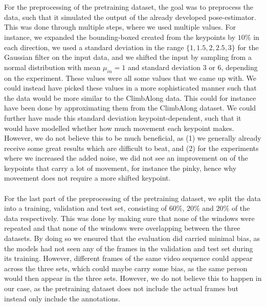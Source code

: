 \documentclass[./main.tex]{subfiles}
\begin{document}
\\
\\
For the preprocessing of the pretraining dataset, the goal was to preprocess the data, such that it simulated the output of the already developed pose-estimator. This was done through multiple steps, where we used multiple values. For instance, we expanded the bounding-boxed created from the keypoints by $10\%$ in each direction, we used a standard deviation in the range $\{1, 1.5, 2, 2.5, 3\}$ for the Gaussian filter on the input data, and we shifted the input by sampling from a normal distribution with mean $\mu_{in} = 1$ and standard deviation $3$ or $6$, depending on the experiment. These values were all some values that we came up with. We could instead have picked these values in a more sophisticated manner such that the data would be more similar to the ClimbAlong data. This could for instance have been done by approximating them from the ClimbAlong dataset. We could further have made this standard deviation keypoint-dependent, such that it would have modelled whether how much movement each keypoint makes. However, we do not believe this to be much beneficial, as (1) we generally already receive some great results which are difficult to beat, and (2) for the experiments where we increased the added noise, we did not see an improvement on of the keypoints that carry a lot of movement, for instance the pinky, hence why moveement does not require a more shifted keypoint.
\\
\\
For the last part of the preprocessing of the pretraining dataset, we split the data into a training, validation and test set, consisting of $60\%$, $20\%$ and $20\%$ of the data respectively. This was done by making sure that none of the windows were repeated and that none of the windows were overlapping between the three datasets. By doing so we ensured that the evaluation did carried minimal bias, as the models had not seen any of the frames in the validation and test set during its training. However, different frames of the same video sequence could appear across the three sets, which could maybe carry some bias, as the same person would then appear in the three sets. However, we do not believe this to happen in our case, as the pretraining dataset does not include the actual frames but instead only include the annotations.
\end{document}
